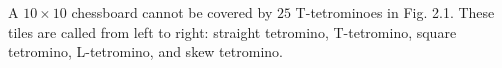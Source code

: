 A $10 \times 10$ chessboard cannot be covered by $25$ T-tetrominoes in Fig. 2.1. These tiles are called from left to right: straight tetromino, T-tetromino, square tetromino, L-tetromino, and skew tetromino.
